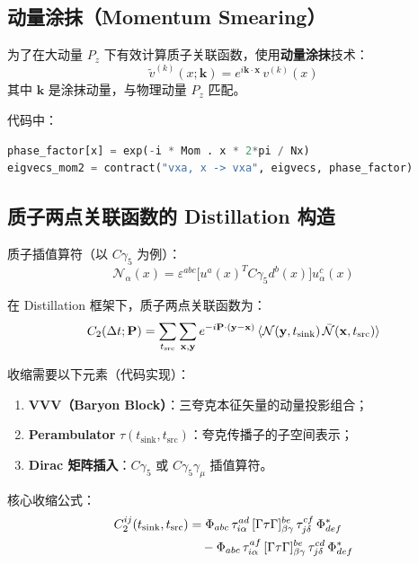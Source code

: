 \documentclass[11pt,a4paper]{ctexart}
\begin{document}
\subsection{动量涂抹（Momentum Smearing）}

为了在大动量 $P_z$ 下有效计算质子关联函数，使用\textbf{动量涂抹}技术：
\begin{equation}\label{eq:momsmear}
\tilde{v}^{(k)}(x; \mathbf{k}) = e^{i \mathbf{k} \cdot \mathbf{x}} \, v^{(k)}(x)
\end{equation}
其中 $\mathbf{k}$ 是涂抹动量，与物理动量 $P_z$ 匹配。

代码中：
\begin{lstlisting}[language=Python]
phase_factor[x] = exp(-i * Mom . x * 2*pi / Nx)
eigvecs_mom2 = contract("vxa, x -> vxa", eigvecs, phase_factor)
\end{lstlisting}

\subsection{质子两点关联函数的 Distillation 构造}

质子插值算符（以 $C\gamma_5$ 为例）：
\begin{equation}
\mathcal{N}_\alpha(x) = \varepsilon^{abc}
\bigl[ u^{a}(x)^T C\gamma_5 d^{b}(x) \bigr] u^{c}_\alpha(x)
\end{equation}

在 Distillation 框架下，质子两点关联函数为：
\begin{equation}
C_2(\Delta t; \mathbf{P}) = \sum_{t_{\text{src}}}
\sum_{\mathbf{x},\mathbf{y}} e^{-i\mathbf{P}\cdot(\mathbf{y}-\mathbf{x})}
\braket{\mathcal{N}(\mathbf{y}, t_{\text{sink}}) \,
\bar{\mathcal{N}}(\mathbf{x}, t_{\text{src}})}
\end{equation}

收缩需要以下元素（代码实现）：
\begin{enumerate}
  \item \textbf{VVV（Baryon Block）}：三夸克本征矢量的动量投影组合；
  \item \textbf{Perambulator} $\tau(t_{\text{sink}}, t_{\text{src}})$：夸克传播子的子空间表示；
  \item \textbf{Dirac 矩阵插入}：$C\gamma_5$ 或 $C\gamma_5\gamma_\mu$ 插值算符。
\end{enumerate}

核心收缩公式：
\begin{align}
C_2^{ij}(t_{\text{sink}}, t_{\text{src}}) &=
\Phi_{abc} \, \tau^{ad}_{i\alpha} \,
[\Gamma \tau \Gamma]^{be}_{\beta\gamma} \,
\tau^{cf}_{j\delta} \, \Phi_{def}^{*} \notag\\
&\quad - \Phi_{abc} \, \tau^{af}_{i\alpha} \,
[\Gamma \tau \Gamma]^{be}_{\beta\gamma} \,
\tau^{cd}_{j\delta} \, \Phi_{def}^{*}
\end{align}
\end{document}
